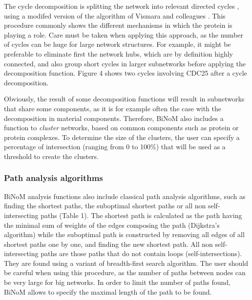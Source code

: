 \documentclass[10pt]{bmc_article}
\newenvironment{bmcformat}{\baselineskip20pt\sloppy\setboolean{publ}{false}}{\baselineskip20pt\sloppy}
\begin{document}
\begin{bmcformat}


The cycle decomposition is splitting the network into relevant directed cycles
\cite{gleiss2001relevant}, using a modifed version of the algorithm of Vismara
and colleagues \cite{vismara1997union}. This procedure commonly shows the
different mechanisms in which the protein is playing a role. Care must
be taken when applying this approach, as the number of cycles can be huge for
large network structures. For example, it might be preferable to eliminate first
the network hubs, which are by definition highly connected, and also group short
cycles in larger subnetworks before applying the decomposition function.
Figure 4 shows two
cycles involving CDC25 after a cycle decomposition.

Obviously, the result of some decomposition functions will result in subnetworks
that share some components, as it is for example often the case
with the decomposition in material components. Therefore, BiNoM also includes a
function to \emph{cluster} networks, based on common components such as protein
or protein complexes. To determine the size of the clusters, the user can
specify a percentage of intersection (ranging from 0 to 100\%) that will be used
as a threshold to create the clusters.


\subsubsection*{Path analysis algorithms}

BiNoM analysis functions also include classical path analysis
algorithms, such as finding the shortest paths, the suboptimal shortest paths or
all non self-intersecting paths (Table 1). The shortest path is calculated as the path having
the minimal sum of weights of the edges composing the path (Dijkstra's
algorithm) while the suboptimal path is constructed by removing all edges of
all shortest paths one by one, and finding the new shortest path. All non self-intersecting paths
are those paths that do not contain loops (self-intersections). They are found using a variant
of breadth-first search algorithm. The user should be careful when using this procedure, as the 
number of paths between nodes can be
very large for big networks. In order to limit the number of paths found, BiNoM
allows to specify the maximal length of the path to be found.



\end{bmcformat}
\end{document}
